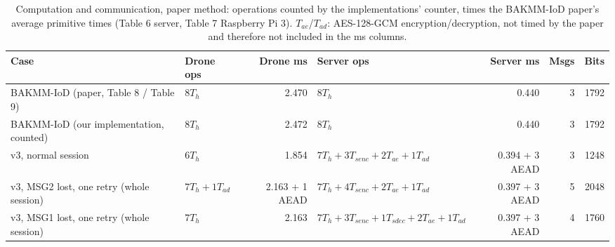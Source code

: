 \begin{table}[!t]
\centering
\footnotesize
\caption{Computation and communication, paper method: operations counted by the implementations' counter, times the BAKMM-IoD paper's average primitive times (Table 6 server, Table 7 Raspberry Pi 3). $T_{ae}$/$T_{ad}$: AES-128-GCM encryption/decryption, not timed by the paper and therefore not included in the ms columns.}
\label{tab:comp}
\setlength{\tabcolsep}{3pt}
\begin{tabular}{p{3.1cm}p{2.3cm}rp{3.5cm}rrr}
\toprule
Case & Drone ops & Drone ms & Server ops & Server ms & Msgs & Bits \\
\midrule
BAKMM-IoD (paper, Table 8 / Table 9) & $8T_h$ & 2.470 & $8T_h$ & 0.440 & 3 & 1792 \\
BAKMM-IoD (our implementation, counted) & $8T_h$ & 2.472 & $8T_h$ & 0.440 & 3 & 1792 \\
v3, normal session & $6T_h$ & 1.854 & $7T_h + 3T_{senc} + 2T_{ae} + 1T_{ad}$ & 0.394 + 3 AEAD & 3 & 1248 \\
v3, MSG2 lost, one retry (whole session) & $7T_h + 1T_{ad}$ & 2.163 + 1 AEAD & $7T_h + 4T_{senc} + 2T_{ae} + 1T_{ad}$ & 0.397 + 3 AEAD & 5 & 2048 \\
v3, MSG1 lost, one retry (whole session) & $7T_h$ & 2.163 & $7T_h + 3T_{senc} + 1T_{sdec} + 2T_{ae} + 1T_{ad}$ & 0.397 + 3 AEAD & 4 & 1760 \\
\bottomrule
\end{tabular}
\end{table}
